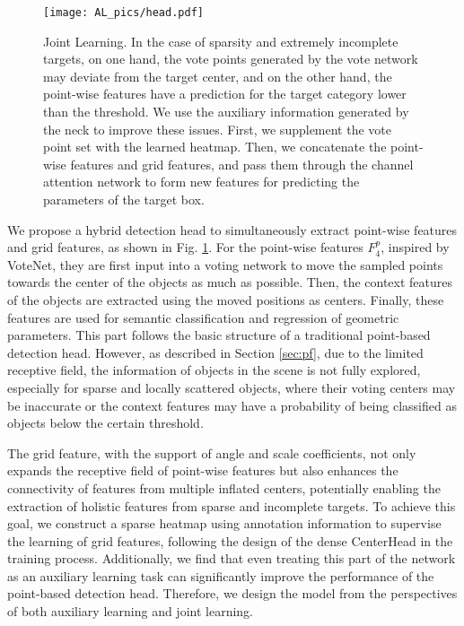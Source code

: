 \begin{figure}[t]
	\begin{center}
		\texttt{[image: AL\_pics/head.pdf]}
	\end{center}
	\vspace{-0.3cm}
	\caption{Joint Learning. In the case of sparsity and extremely incomplete targets, on one hand, the vote points generated by the vote network may deviate from the target center, and on the other hand, the point-wise features have a prediction for the target category lower than the threshold. We use the auxiliary information generated by the neck to improve these issues. First, we supplement the vote point set with the learned heatmap. Then, we concatenate the point-wise features and grid features, and pass them through the channel attention network to form new features for predicting the parameters of the target box.}
	\label{fig7}
	\vspace{-0.3cm}
\end{figure}

We propose a hybrid detection head to simultaneously extract point-wise features and grid features, as shown in Fig. \ref{fig7}. For the point-wise features $F^p_4$, inspired by VoteNet, they are first input into a voting network to move the sampled points towards the center of the objects as much as possible. Then, the context features of the objects are extracted using the moved positions as centers. Finally, these features are used for semantic classification and regression of geometric parameters. This part follows the basic structure of a traditional point-based detection head. However, as described in Section \ref{sec:pf}, due to the limited receptive field, the information of objects in the scene is not fully explored, especially for sparse and locally scattered objects, where their voting centers may be inaccurate or the context features may have a probability of being classified as objects below the certain threshold.

The grid feature, with the support of angle and scale coefficients, not only expands the receptive field of point-wise features but also enhances the connectivity of features from multiple inflated centers, potentially enabling the extraction of holistic features from sparse and incomplete targets. To achieve this goal, we construct a sparse heatmap using annotation information to supervise the learning of grid features, following the design of the dense CenterHead in the training process. Additionally, we find that even treating this part of the network as an auxiliary learning task can significantly improve the performance of the point-based detection head. Therefore, we design the model from the perspectives of both auxiliary learning and joint learning.

